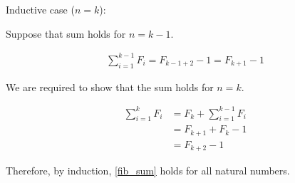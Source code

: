 \documentclass[12pt]{article}
\begin{document}
Inductive case ($n = k$):

Suppose that sum holds for $n = k - 1$. 

\begin{align}
  \sum_{i = 1}^{k - 1} F_i = F_{k - 1 + 2} - 1 = F_{k + 1} - 1
  \label{ind_hyp}
\end{align}

We are required to show that the sum holds for $n = k$.

\begin{align*}
  \sum_{i = 1}^{k} F_i & = F_{k} + \sum_{i = 1}^{k - 1} F_i\\
                       & = F_{k + 1} + F_{k} - 1\\
                       & = F_{k + 2} - 1 
\end{align*}

Therefore, by induction, \ref{fib_sum} holds for all natural
numbers.







\printbibliography
\end{document}
